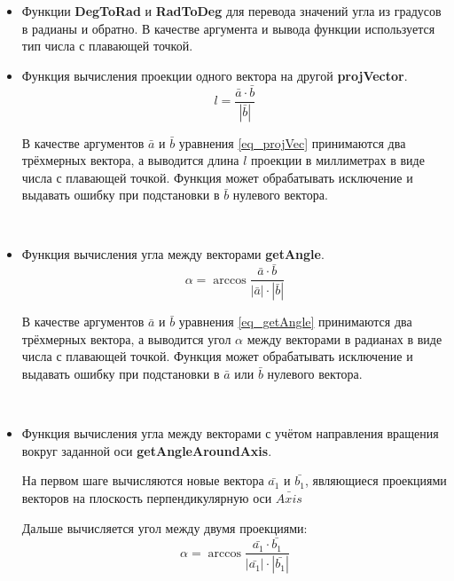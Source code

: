 \begin{itemize}
    \item 
Функции \textbf{DegToRad} и \textbf{RadToDeg} для перевода значений угла из градусов в радианы и обратно. В качестве аргумента и вывода функции используется тип числа с плавающей точкой.
\item
Функция вычисления проекции одного вектора на другой \textbf{projVector}.
\begin{equation} \label{eq_projVec}
    l = \frac{\bar{a} \cdot \bar{b}}{\left |\bar{b} \right|} %
\end{equation}

В качестве аргументов $\bar{a}$ и $\bar{b}$ уравнения \eqref{eq_projVec} принимаются два трёхмерных вектора, а выводится длина $l$ проекции в миллиметрах в виде числа с плавающей точкой. Функция может обрабатывать исключение и выдавать ошибку при подстановки в $\bar{b}$ нулевого вектора.

~

\item
Функция вычисления угла между векторами \textbf{getAngle}.
\begin{equation} \label{eq_getAngle}
    \alpha = \arccos{\frac{\bar{a} \cdot \bar{b}}{\left |\bar{a} \right| \cdot \left |\bar{b} \right|}} %
\end{equation}

В качестве аргументов $\bar{a}$ и $\bar{b}$ уравнения \eqref{eq_getAngle} принимаются два трёхмерных вектора, а выводится угол $\alpha$ между векторами в радианах в виде числа с плавающей точкой. Функция может обрабатывать исключение и выдавать ошибку при подстановки в $\bar{a}$ или $\bar{b}$ нулевого вектора.

~

\item
Функция вычисления угла между векторами с учётом направления вращения вокруг заданной оси \textbf{getAngleAroundAxis}.

На первом шаге вычисляются новые вектора $\bar{a_1}$ и $\bar{b_1}$, являющиеся проекциями векторов на плоскость перпендикулярную оси $\bar{Axis}$

Дальше вычисляется угол между двумя проекциями:
\begin{equation} \label{eq_getAngleAroundAxis}
    \alpha = \arccos{\frac{\bar{a_1} \cdot \bar{b_1}}{\left |\bar{a_1} \right| \cdot \left |\bar{b_1} \right|}} %
\end{equation}


\end{itemize}
